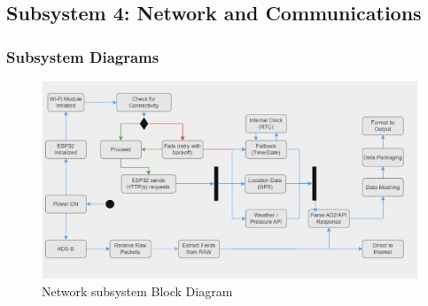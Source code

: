 \clearpage
\subsection{Subsystem 4: Network and Communications}

\subsubsection{Subsystem Diagrams}
\begin{figure}[h]
    \centering
    \includegraphics[width=16cm]{images/Communications/SubsystemDiagram-communcations.jpg} %
    \caption{Network subsystem Block Diagram}
\end{figure} %

